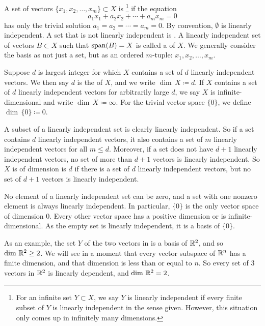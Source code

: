 \begin{defn}
A set of vectors $\{ x_1, x_2, \ldots, x_m \} \subset X$ is 
\emph{}\footnote{%
For an infinite set $Y \subset X$, we say $Y$ is linearly
independent if every finite subset of $Y$ is linearly independent
in the sense given.
However, this situation only comes up in infinitely many dimensions.}
if the equation
\begin{equation} \label{eq:lincomb}
a_1 x_1 + a_2 x_2 + \cdots + a_m x_m = 0
\end{equation}
has only the trivial solution $a_1 = a_2 = \cdots = a_m = 0$.
By convention, $\emptyset$ is linearly independent.
A set that is not linearly independent is
\emph{}.
%
A linearly independent set of vectors $B \subset X$ such that
$\operatorname{span}(B) = X$ 
is called a \emph{} of $X$.
We generally consider the basis as not just a set, but as
an ordered $m$-tuple:
$x_1,x_2,\ldots,x_m$.

Suppose $d$ is largest integer for which $X$ contains a set of
$d$ linearly independent vectors.  We then say $d$ is
the \emph{} of $X$,
and we write $\dim \, X \coloneqq d$.
If $X$ contains a set of $d$ linearly independent vectors 
for arbitrarily large $d$, we say
$X$ is infinite-dimensional and write $\dim \, X \coloneqq \infty$.
%
For the trivial vector space $\{ 0 \}$, we define $\dim \, \{ 0 \} \coloneqq 0$.
\end{defn}

A subset of a linearly independent set is clearly linearly independent.
So if a set contains $d$ linearly independent vectors, it also contains a
set of $m$ linearly independent vectors for all $m \leq d$.
Moreover, if a set does not have $d+1$
linearly independent vectors, no set of more than $d+1$ vectors is linearly
independent.
So $X$ is of dimension is $d$ if there
is a set of $d$ linearly independent vectors, but no
set of $d+1$ vectors is linearly independent.

No element of a linearly independent set can be zero,
and a set with one nonzero element is always linearly independent.
In particular, $\{ 0 \}$ is the only vector space of dimension $0$.
Every other vector space has a positive dimension
or is infinite-dimensional.
As the empty set is linearly independent, it is a basis
of $\{ 0 \}$.

As an example, the
set $Y$ of the two vectors in
 is a basis of ${\mathbb{R}}^2$, and so
$\dim \, {\mathbb{R}}^2 \geq 2$.
We will see in a moment that every vector subspace of ${\mathbb{R}}^n$
has a finite dimension, and that dimension is less than or equal to $n$.
So every set of 3 vectors in ${\mathbb{R}}^2$ is linearly dependent, and
$\dim \, {\mathbb{R}}^2 = 2$.

